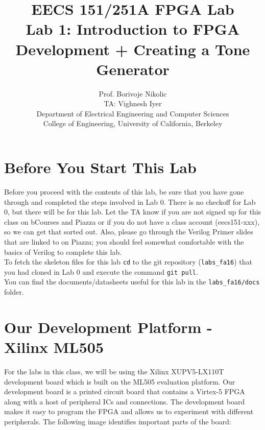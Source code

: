 \documentclass[11pt]{article}
\begin{document}
\title{EECS 151/251A FPGA Lab\\
Lab 1: Introduction to FPGA Development + Creating a Tone Generator}

\author{Prof. Borivoje Nikolic \\
TA: Vighnesh Iyer \\Department of Electrical Engineering and Computer Sciences\\
College of Engineering, University of California, Berkeley}
\date{}
\maketitle

\section{Before You Start This Lab}

Before you proceed with the contents of this lab, be sure that you have gone through and completed the steps involved in Lab 0. There is no checkoff for Lab 0, but there will be for this lab. Let the TA know if you are not signed up for this class on bCourses and Piazza or if you do not have a class account (eecs151-xxx), so we can get that sorted out. Also, please go through the Verilog Primer slides that are linked to on Piazza; you should feel somewhat comfortable with the basics of Verilog to complete this lab.\\

To fetch the skeleton files for this lab \verb|cd| to the git repository (\verb|labs_fa16|) that you had cloned in Lab 0 and execute the command \verb|git pull|.\\

You can find the documents/datasheets useful for this lab in the \verb|labs_fa16/docs| folder.

\section{Our Development Platform - Xilinx ML505}
For the labs in this class, we will be using the Xilinx XUPV5-LX110T development board which is built on the ML505 evaluation platform. Our development board is a printed circuit board that contains a Virtex-5 FPGA along with a host of peripheral ICs and connections. The development board makes it easy to program the FPGA and allows us to experiment with different peripherals. The following image identifies important parts of the board:
\end{document}
